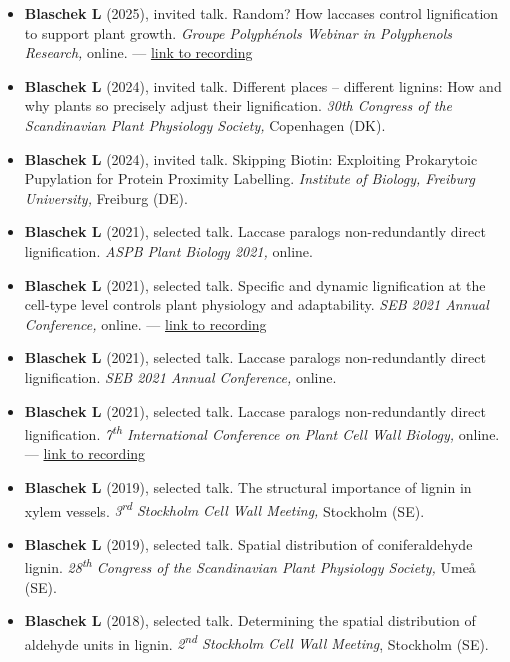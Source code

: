 \documentclass[11pt]{article}
\begin{document}
\vspace{-0.175cm}
\begin{itemize}[label={},itemindent=-9pt,leftmargin=24pt]
	\itemsep-0.1cm
	\item \textbf{Blaschek L} (2025), invited talk. Random? How laccases control lignification to support plant growth. \textit{Groupe Polyphénols Webinar in Polyphenols Research,} online. --- \href{https://youtu.be/di9B15gOkNU?si=6yiy5lkGwR6dFIDy&t=862}{link to recording}
	\item \textbf{Blaschek L} (2024), invited talk. Different places – different lignins:
	How and why plants so precisely adjust their lignification. \textit{30th Congress of the Scandinavian Plant Physiology Society,} Copenhagen (DK).
	\item \textbf{Blaschek L} (2024), invited talk. Skipping Biotin: Exploiting Prokarytoic Pupylation for Protein Proximity Labelling. \textit{Institute of Biology, Freiburg University,} Freiburg (DE).
	\item \textbf{Blaschek L} (2021), selected talk. Laccase paralogs non-redundantly direct lignification. \textit{ASPB Plant Biology 2021,} online.
	\item \textbf{Blaschek L} (2021), selected talk. Specific and dynamic lignification at the cell-type level controls plant physiology and adaptability. \textit{SEB 2021 Annual Conference,} online. --- \href{https://leonardblaschek.github.io/talks.html}{link to recording}
	\item \textbf{Blaschek L} (2021), selected talk. Laccase paralogs non-redundantly direct lignification. \textit{SEB 2021 Annual Conference,} online.
	\item \textbf{Blaschek L} (2021), selected talk. Laccase paralogs non-redundantly direct lignification. \textit{7\textsuperscript{th} International Conference on Plant Cell Wall Biology,} online. --- \href{https://leonardblaschek.github.io/talks.html}{link to recording}
	\item \textbf{Blaschek L} (2019), selected talk. The structural importance of lignin in xylem vessels. \textit{3\textsuperscript{rd} Stockholm Cell Wall Meeting,} Stockholm (SE).
	\item \textbf{Blaschek L} (2019), selected talk. Spatial distribution of coniferaldehyde lignin. \textit{28\textsuperscript{th} Congress of the Scandinavian Plant Physiology Society,} Umeå (SE).
	\item \textbf{Blaschek L} (2018), selected talk. Determining the spatial distribution of aldehyde units in lignin. \textit{2\textsuperscript{nd} Stockholm Cell Wall Meeting}, Stockholm (SE).
\end{itemize}
\vspace{0.3cm}
\end{document}
